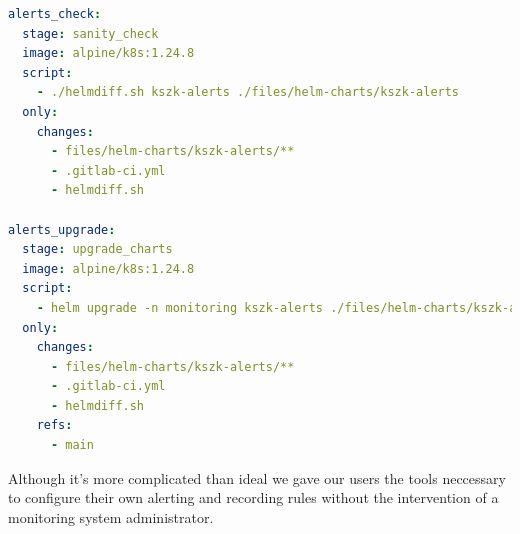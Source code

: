\begin{lstlisting}[language=yaml,caption=New jobs in .gitlab-ci.yml]
alerts_check:
  stage: sanity_check
  image: alpine/k8s:1.24.8
  script:
    - ./helmdiff.sh kszk-alerts ./files/helm-charts/kszk-alerts
  only:
    changes:
      - files/helm-charts/kszk-alerts/**
      - .gitlab-ci.yml
      - helmdiff.sh

alerts_upgrade:
  stage: upgrade_charts
  image: alpine/k8s:1.24.8
  script:
    - helm upgrade -n monitoring kszk-alerts ./files/helm-charts/kszk-alerts
  only:
    changes:
      - files/helm-charts/kszk-alerts/**
      - .gitlab-ci.yml
      - helmdiff.sh
    refs:
      - main
\end{lstlisting}

Although it's more complicated than ideal we gave our users the tools
neccessary to configure their own alerting and recording rules without the
intervention of a monitoring system administrator.
